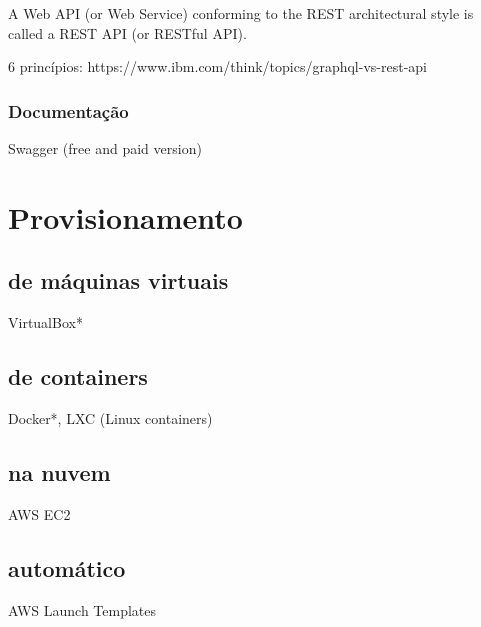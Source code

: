 A Web API (or Web Service) conforming to the REST architectural style is called a REST API (or RESTful API). 

6 princípios: https://www.ibm.com/think/topics/graphql-vs-rest-api

\subsubsection{Documentação}
Swagger (free and paid version)


\section{Provisionamento}

\subsection{de máquinas virtuais}
VirtualBox*

\subsection{de containers}
Docker*, LXC (Linux containers)

\subsection{na nuvem}
AWS EC2

\subsection{automático}
AWS Launch Templates


